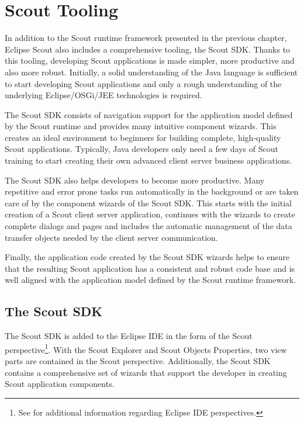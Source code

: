 \documentclass[a4paper,10pt,twoside]{book}
\begin{document}
  \sloppy
\fi

\chapter{Scout Tooling}

In addition to the Scout runtime framework presented in the previous chapter, Eclipse Scout also includes a comprehensive tooling, the Scout SDK. 
Thanks to this tooling, developing Scout applications is made simpler, more productive and also more robust. 
Initially, a solid understanding of the Java language is sufficient to start developing Scout applications and only a rough understanding of the underlying Eclipse/OSGi/JEE technologies is required. 

The Scout SDK consists of navigation support for the application model defined by the Scout runtime and provides many intuitive component wizards. 
This creates an ideal environment to beginners for building complete, high-quality Scout applications. 
Typically, Java developers only need a few days of Scout training to start creating their own advanced client server business applications. 

The Scout SDK also helps developers to become more productive.
Many repetitive and error prone tasks run automatically in the background or are taken care of by the component wizards of the Scout SDK. 
This starts with the initial creation of a Scout client server application, continues with the wizards to create complete dialogs and pages and includes the automatic management of the data transfer objects needed by the client server communication.

Finally, the application code created by the Scout SDK wizards helps to ensure that the resulting Scout application has a consistent and robust code base and is well aligned with the application model defined by the Scout runtime framework.

\section{The Scout SDK}

The Scout SDK is added to the Eclipse IDE in the form of the Scout perspective\footnote{
See  for additional information regarding Eclipse IDE perspectives. 
}.
With the Scout Explorer and Scout Objects Properties, two view parts are contained in the Scout perspective. 
Additionally, the Scout SDK contains a comprehensive set of wizards that support the developer in creating Scout application components. 
\end{document}
